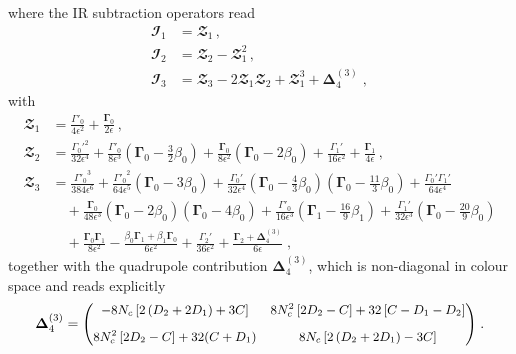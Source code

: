 where the IR subtraction operators read
\begin{align}
\mathbfcal{I}_{1}  &= \mathbfcal{Z}_1 \label{I1}\,,\\%
\mathbfcal{I}_{2} &=  \mathbfcal{Z}_2 - \mathbfcal{Z}_1^2  \label{I2}\,, \\ %
 \mathbfcal{I}_{3} &= \mathbfcal{Z}_3    -   2\mathbfcal{Z}_1  \mathbfcal{Z}_2 + \mathbfcal{Z}_1^3 + \mathbf{\Delta}_4^{(3)}  \;,\label{I3}
\end{align}
with 
\begin{align}
 \mathbfcal{Z}_1 &=  \frac{\Gamma'_0}{4 \epsilon^2} + \frac{\mathbf{\Gamma}_0}{2 \epsilon} \,,   \label{Z1}\\%
\mathbfcal{Z}_2 &=   \frac{{\Gamma_0'}^2}{32 \epsilon^4} + \frac{\Gamma'_0}{8 \epsilon^3} \left( \mathbf{\Gamma}_0 - \frac{3}{2} \beta_0  \right) +  \frac{\mathbf{\Gamma}_0}{8 \epsilon^2}(\mathbf{\Gamma}_0 - 2 \beta_0)  + \frac{\Gamma_1'}{16 \epsilon^2} + \frac{\mathbf{\Gamma}_1}{4 \epsilon}\,, \label{Z2}\\ %
\mathbfcal{Z}_3 &=  \frac{{\Gamma'_0}^3}{384 \epsilon^6}  + \frac{{\Gamma'_0}^2}{64 \epsilon^5}(\mathbf{\Gamma}_0 - 3 \beta_0) + \frac{\Gamma_0'}{32 \epsilon^4} \left( \mathbf{\Gamma}_0 - \frac{4}{3} \beta_0 \right) \left( \mathbf{\Gamma}_0 - \frac{11}{3} \beta_0 \right)  + \frac{\Gamma_0' \Gamma_1'}{64 \epsilon^4}  \nonumber\\%
& \quad +\frac{\mathbf{\Gamma}_0}{48\epsilon^3}(\mathbf{\Gamma}_0 - 2 \beta_0)(\mathbf{\Gamma}_0 - 4 \beta_0) + \frac{\Gamma'_0}{16 \epsilon^3} \left( \mathbf{\Gamma}_1 - \frac{16}{9} \beta_1\right) + \frac{\Gamma_1'}{32 \epsilon^3} \left( \mathbf{\Gamma}_0 - \frac{20}{9} \beta_0 \right)  \nonumber\\ %
&\quad + \frac{\mathbf{\Gamma}_0 \mathbf{\Gamma}_1}{8 \epsilon^2} - \frac{\beta_0 \mathbf{\Gamma}_1 + \beta_1 \mathbf{\Gamma}_0}{6 \epsilon^2} + \frac{\Gamma_2'}{36 \epsilon^2 } + \frac{\mathbf{\Gamma}_2 + \mathbf{\Delta}_4^{(3)}}{6 \epsilon} \; ,\label{Z3}
\end{align}
together with the quadrupole contribution $\mathbf{\Delta}_4^{(3)}$, 
which is non-diagonal in colour space and reads explicitly
\begin{equation}\label{delta_4_main}
\mathbf{\Delta}_4^{(3)} = {\small
\begin{pmatrix}
 - 8 N_c \left[2 \left(D_2+2 D_1 \right) + 3 C \right] & 8 N_c^2 \left[2 D_2 - C\right]+32 \left[C-  D_1- D_2 \right] \\[8pt]
 8 N_c^2 \left[2 D_2- C\right]+32(C+ D_1) & 8 N_c \left[2 \left(D_2+2 D_1\right)-3 C\right] 
\end{pmatrix}
} \; .
\end{equation}
